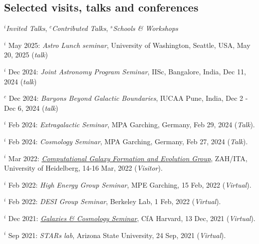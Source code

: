 \documentclass[12pt,letterpaper]{article}
\begin{document}
\subsection{Selected visits, talks and conferences}
\vspace{-1mm}
$^i$\emph{Invited Talks}, $^c$\emph{Contributed Talks}, $^s$\emph{Schools \& Workshops}
\begin{list}{}{\cvlist}
\item $^i$ May 2025:  \emph{Astro Lunch seminar}, University of Washington, Seattle, USA, May 20, 2025 (\textit{talk})
\item $^i$ Dec 2024:  \emph{Joint Astronomy Program Seminar}, IISc, Bangalore, India, Dec 11, 2024 (\textit{talk})
\item $^c$ Dec 2024:  \emph{Baryons Beyond Galactic Boundaries}, IUCAA Pune, India, Dec 2 - Dec 6, 2024 (\textit{talk})
\item $^i$ Feb 2024:  \emph{Extragalactic Seminar}, MPA Garching, Germany, Feb 29, 2024 (\textit{Talk}).
\item $^i$ Feb 2024:  \emph{Cosmology Seminar}, MPA Garching, Germany, Feb 27, 2024 (\textit{Talk}).
\item $^i$ Mar 2022:  \emph{\href{https://zah.uni-heidelberg.de/research-groups\#c2659}{Computational Galaxy Formation and Evolution Group}}, ZAH/ITA, University of Heidelberg, 14-16 Mar, 2022 (\textit{Visitor}).
\item $^i$ Feb 2022:  \emph{High Energy Group Seminar}, MPE Garching, 15 Feb, 2022 (\textit{Virtual}).
\item $^i$ Feb 2022:  \emph{DESI Group Seminar}, Berkeley Lab, 1 Feb, 2022 (\textit{Virtual}).
\item $^i$ Dec 2021:  \emph{\href{https://pweb.cfa.harvard.edu/calendar/event/9298}{Galaxies \& Cosmology Seminar}}, CfA Harvard, 13 Dec, 2021 (\textit{Virtual}).
\item $^i$ Sep 2021:  \textit{STARs lab}, Arizona State University, 24 Sep, 2021 (\textit{Virtual}).
\end{list}
\vspace{-1.5mm}
\end{document}
